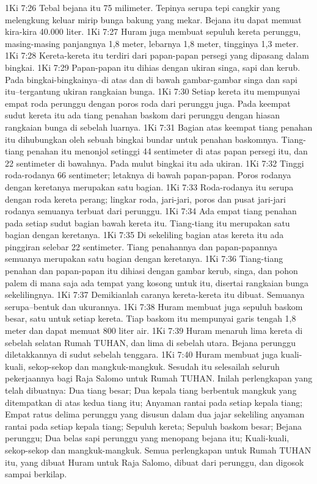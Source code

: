 1Ki 7:26  Tebal bejana itu 75 milimeter. Tepinya serupa tepi cangkir yang melengkung keluar mirip bunga bakung yang mekar. Bejana itu dapat memuat kira-kira 40.000 liter.
1Ki 7:27  Huram juga membuat sepuluh kereta perunggu, masing-masing panjangnya 1,8 meter, lebarnya 1,8 meter, tingginya 1,3 meter.
1Ki 7:28  Kereta-kereta itu terdiri dari papan-papan persegi yang dipasang dalam bingkai.
1Ki 7:29  Papan-papan itu dihias dengan ukiran singa, sapi dan kerub. Pada bingkai-bingkainya--di atas dan di bawah gambar-gambar singa dan sapi itu--tergantung ukiran rangkaian bunga.
1Ki 7:30  Setiap kereta itu mempunyai empat roda perunggu dengan poros roda dari perunggu juga. Pada keempat sudut kereta itu ada tiang penahan baskom dari perunggu dengan hiasan rangkaian bunga di sebelah luarnya.
1Ki 7:31  Bagian atas keempat tiang penahan itu dihubungkan oleh sebuah bingkai bundar untuk penahan baskomnya. Tiang-tiang penahan itu menonjol setinggi 44 sentimeter di atas papan persegi itu, dan 22 sentimeter di bawahnya. Pada mulut bingkai itu ada ukiran.
1Ki 7:32  Tinggi roda-rodanya 66 sentimeter; letaknya di bawah papan-papan. Poros rodanya dengan keretanya merupakan satu bagian.
1Ki 7:33  Roda-rodanya itu serupa dengan roda kereta perang; lingkar roda, jari-jari, poros dan pusat jari-jari rodanya semuanya terbuat dari perunggu.
1Ki 7:34  Ada empat tiang penahan pada setiap sudut bagian bawah kereta itu. Tiang-tiang itu merupakan satu bagian dengan keretanya.
1Ki 7:35  Di sekeliling bagian atas kereta itu ada pinggiran selebar 22 sentimeter. Tiang penahannya dan papan-papannya semuanya merupakan satu bagian dengan keretanya.
1Ki 7:36  Tiang-tiang penahan dan papan-papan itu dihiasi dengan gambar kerub, singa, dan pohon palem di mana saja ada tempat yang kosong untuk itu, disertai rangkaian bunga sekelilingnya.
1Ki 7:37  Demikianlah caranya kereta-kereta itu dibuat. Semuanya serupa--bentuk dan ukurannya.
1Ki 7:38  Huram membuat juga sepuluh baskom besar, satu untuk setiap kereta. Tiap baskom itu mempunyai garis tengah 1,8 meter dan dapat memuat 800 liter air.
1Ki 7:39  Huram menaruh lima kereta di sebelah selatan Rumah TUHAN, dan lima di sebelah utara. Bejana perunggu diletakkannya di sudut sebelah tenggara.
1Ki 7:40  Huram membuat juga kuali-kuali, sekop-sekop dan mangkuk-mangkuk. Sesudah itu selesailah seluruh pekerjaannya bagi Raja Salomo untuk Rumah TUHAN. Inilah perlengkapan yang telah dibuatnya: Dua tiang besar; Dua kepala tiang berbentuk mangkuk yang ditempatkan di atas kedua tiang itu; Anyaman rantai pada setiap kepala tiang; Empat ratus delima perunggu yang disusun dalam dua jajar sekeliling anyaman rantai pada setiap kepala tiang; Sepuluh kereta; Sepuluh baskom besar; Bejana perunggu; Dua belas sapi perunggu yang menopang bejana itu; Kuali-kuali, sekop-sekop dan mangkuk-mangkuk. Semua perlengkapan untuk Rumah TUHAN itu, yang dibuat Huram untuk Raja Salomo, dibuat dari perunggu, dan digosok sampai berkilap.
